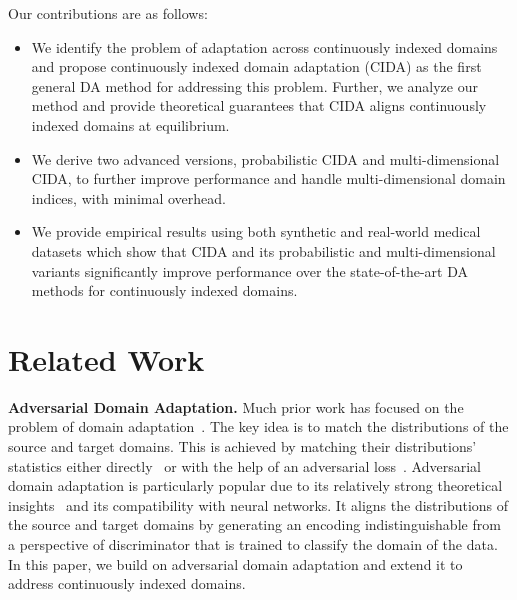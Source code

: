 \documentclass{article}
\begin{document}
Our contributions are as follows:
\begin{itemize}
\item We identify the problem of adaptation across continuously indexed domains and propose continuously indexed domain adaptation (CIDA) as the first general DA method for addressing this problem. Further, we analyze our method and provide theoretical guarantees that CIDA aligns continuously indexed domains at equilibrium. 
\item We derive two advanced versions, probabilistic CIDA and multi-dimensional CIDA, to further improve performance and handle multi-dimensional domain indices, with minimal overhead.
\item 
We provide empirical results using both synthetic and real-world medical datasets which show that CIDA and its probabilistic and multi-dimensional variants significantly improve performance over the state-of-the-art DA methods for continuously indexed domains. 
\end{itemize}


 \section{Related Work}\label{sec:related}
\textbf{Adversarial Domain Adaptation.} Much prior work has focused on the problem of domain adaptation~\cite{CDANN,CDAN,MCD,GTA,MDD}. The key idea is to match the distributions of the source and target domains. This is achieved by matching their distributions' statistics either directly~\cite{MMD,DDC,CORAL} or with the help of an adversarial loss~\cite{DANN,CDANN,ADDA,MDD,UDA-SGD}. Adversarial domain adaptation is particularly popular due to its relatively strong theoretical insights~\cite{GAN,AMSDA,MDD,InvariantDA} and its compatibility with neural networks. It aligns the distributions of the source and target domains by generating an encoding indistinguishable from a perspective of discriminator that is trained to classify the domain of the data. In this paper, we build on adversarial domain adaptation and extend it to address continuously indexed domains. 
\end{document}
